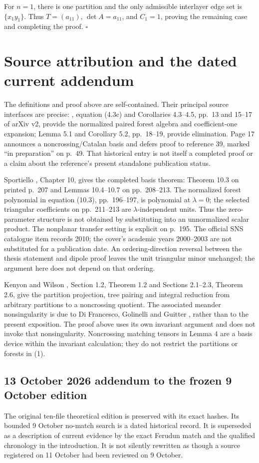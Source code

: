 \documentclass[11pt]{article}
\begin{document}
For \(n=1\), there is one partition and the only admissible interlayer edge set is \(\{x_1y_1\}\). Thus \(T=(a_{11})\), \(\det A=a_{11}\), and \(C_1=1\), proving the remaining case and completing the proof. \(\square\)

\section{Source attribution and the dated current addendum}
The definitions and proof above are self-contained. Their principal source interfaces are precise: \cite{CSS}, equation (4.3c) and Corollaries 4.3--4.5, pp.~13 and 15--17 of arXiv v2, provide the normalized paired forest algebra and coefficient-one expansion; Lemma 5.1 and Corollary 5.2, pp.~18--19, provide elimination. Page 17 announces a noncrossing/Catalan basis and defers proof to reference 39, marked ``in preparation'' on p.~49. That historical entry is not itself a completed proof or a claim about the reference's present standalone publication status.

Sportiello \cite{Sportiello}, Chapter 10, gives the completed basis theorem: Theorem 10.3 on printed p.~207 and Lemmas 10.4--10.7 on pp.~208--213. The normalized forest polynomial in equation (10.3), pp.~196--197, is polynomial at $\lambda=0$; the selected triangular coefficients on pp.~211--213 are $\lambda$-independent units. Thus the zero-parameter structure is not obtained by substituting into an unnormalized scalar product. The nonplanar transfer setting is explicit on p.~195. The official SNS catalogue item records 2010; the cover's academic years 2000--2003 are not substituted for a publication date. An ordering-direction reversal between the thesis statement and dipole proof leaves the unit triangular minor unchanged; the argument here does not depend on that ordering.

Kenyon and Wilson \cite{KW}, Section 1.2, Theorem 1.2 and Sections 2.1--2.3, Theorem 2.6, give the partition projection, tree pairing and integral reduction from arbitrary partitions to a noncrossing quotient. The associated meander nonsingularity is due to Di Francesco, Golinelli and Guitter \cite{DFGG}, rather than to the present exposition. The proof above uses its own invariant argument and does not invoke that nonsingularity. Noncrossing matching tensors in Lemma 4 are a basis device within the invariant calculation; they do not restrict the partitions or forests in (1).

\subsection*{13 October 2026 addendum to the frozen 9 October edition}
The original ten-file theoretical edition is preserved with its exact hashes. Its bounded 9 October no-match search is a dated historical record. It is superseded as a description of current evidence by the exact Ferudun match \cite{Ferudun} and the qualified chronology in the introduction. It is not silently rewritten as though a source registered on 11 October had been reviewed on 9 October.
\end{document}
